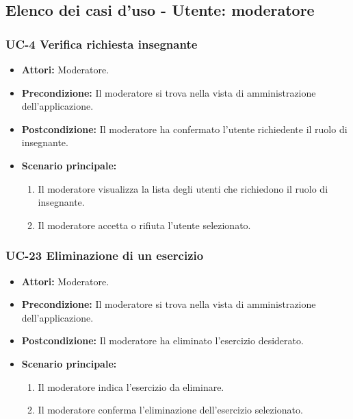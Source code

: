 \subsection{Elenco dei casi d'uso - Utente: moderatore}	
\subsubsection{UC-4 Verifica richiesta insegnante}
		\begin{itemize}
			\item \textbf{Attori:} Moderatore.
			\item \textbf{Precondizione:} Il moderatore si trova nella vista di amministrazione dell'applicazione.
			\item \textbf{Postcondizione:} Il moderatore ha confermato l'utente richiedente il ruolo di insegnante.
			\item \textbf{Scenario principale:}
				\begin{enumerate}
					\item Il moderatore visualizza la lista degli utenti che richiedono il ruolo di insegnante.
					\item Il moderatore accetta o rifiuta l'utente selezionato.
				\end{enumerate}
		\end{itemize}
		
\subsubsection{UC-23 Eliminazione di un esercizio}
			\begin{itemize}
			\item \textbf{Attori:} Moderatore.
			\item \textbf{Precondizione:} Il moderatore si trova nella vista di amministrazione dell'applicazione.
			\item \textbf{Postcondizione:} Il moderatore ha eliminato l'esercizio desiderato.
			\item \textbf{Scenario principale:}
				\begin{enumerate}
					\item Il moderatore indica l'esercizio da eliminare.
					\item Il moderatore conferma l'eliminazione dell'esercizio selezionato.
				\end{enumerate}
		\end{itemize}

